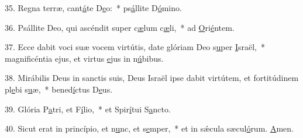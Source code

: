 35. Regna terræ, cant\uline{á}te D\uline{e}o:~* ps\uline{á}llite D\uline{ó}mino.\par 
36. Psállite Deo, qui ascéndit super c\uline{æ}lum c\uline{æ}li,~* ad \uline{O}ri\uline{é}ntem.\par 
37. Ecce dabit voci suæ vocem virtútis, date glóriam Deo s\uline{u}per \uline{I}sraël,~* magnificéntia ejus, et virtus \uline{e}jus in n\uline{ú}bibus.\par 
38. Mirábilis Deus in sanctis suis, Deus Israël ipse dabit virtútem, et fortitúdinem pl\uline{e}bi s\uline{u}æ,~* bened\uline{í}ctus D\uline{e}us.\par 
39. Glória P\uline{a}tri, et F\uline{í}lio,~* et Spir\uline{í}tui S\uline{a}ncto.\par 
40. Sicut erat in princípio, et n\uline{u}nc, et s\uline{e}mper,~* et in sǽcula sæcul\uline{ó}rum. \uline{A}men.\par 
